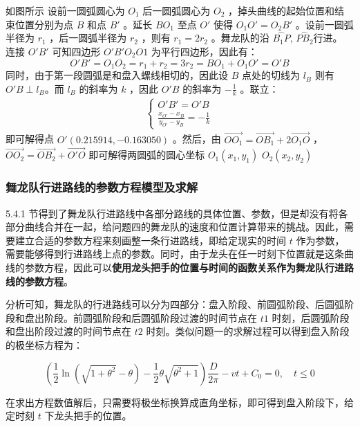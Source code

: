 \documentclass[a4paper]{article}
\begin{document}
		如图所示
		设前一圆弧圆心为 $O_1$ 后一圆弧圆心为 $O_2$ ，掉头曲线的起始位置和结束位置分别为点 $B$ 和点 $B'$ 。延长 $B O_1$ 至点 $O'$ 使得 $O_1O' = O_2B'$ 。设前一圆弧半径为 $r_1$ ，后一圆弧半径为 $r_2$ ，则有 $r_1 = 2r_2$ 。舞龙队的沿 $\overset{\frown}{B_1 P}$, $\overset{\frown}{PB_2}$行进。 连接 $O'B'$ 可知四边形 $O'B'O_2O1$ 为平行四边形，因此有：
		$$ O'B'= O_1O_2 = r_1 + r_2 = 3r_2 = BO_1 + O_1O' = O'B$$
		同时，由于第一段圆弧是和盘入螺线相切的，因此设 $B$ 点处的切线为 $l_B$ 则有 $O'B \perp l_B$。而 $l_B$ 的斜率为 $k$ ，因此 $O'B$ 的斜率为 $-\frac{1}{k}$ 。联立：
		\begin{align}
			\left\{
			\begin{aligned}
				O'B'=O'B \\
				\frac{x_{O'} - x_B}{y_{O'} - y_B} = -\frac{1}{k}
			\end{aligned}
			\right.
		\end{align}
		即可解得点 $O'(0.215914, -0.163050)$ 。然后，由 $\overrightarrow{OO_1} = \overrightarrow{OB_1} + 2\overrightarrow{O_1O}$ ， $\overrightarrow{OO_2} = \overrightarrow{OB_2} + \overrightarrow{O'O}$ 即可解得两圆弧的圆心坐标 $O_1(x_1, y_1)$ $O_2(x_2, y_2)$

	\subsubsection{舞龙队行进路线的参数方程模型及求解}
	
		5.4.1 节得到了舞龙队行进路线中各部分路线的具体位置、参数，但是却没有将各部分曲线合并在一起，给问题四的舞龙队的速度和位置计算带来的挑战。因此，需要建立合适的参数方程来刻画整一条行进路线，即给定现实的时间 $t$ 作为参数，需要能够得到行进路线上点的参数。同时，由于龙头在任一时刻下位置就是这条曲线的参数方程，因此可以\textbf{使用龙头把手的位置与时间的函数关系作为舞龙队行进路线的参数方程}。
		
		分析可知，舞龙队的行进路线可以分为四部分：盘入阶段、前圆弧阶段、后圆弧阶段和盘出阶段。前圆弧阶段和后圆弧阶段过渡的时间节点在 $t1$ 时刻，后圆弧阶段和盘出阶段过渡的时间节点在 $t2$ 时刻。类似问题一的求解过程可以得到盘入阶段的极坐标方程为：
		
		\begin{equation}
			(\frac{1}{2}\ln(\sqrt{1 + \theta^2} - \theta) - \frac{1}{2} \theta \sqrt{\theta^2 + 1}) \frac{D}{2 \pi} - vt + C_0 = 0, \quad t \le 0
		\end{equation}
		
		在求出方程数值解后，只需要将极坐标换算成直角坐标，即可得到盘入阶段下，给定时刻 $t$ 下龙头把手的位置。
		
\end{document}
